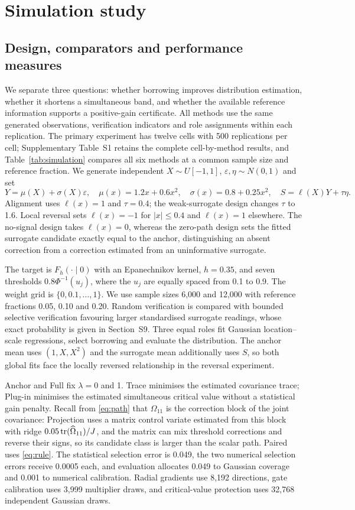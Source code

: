 \section{Simulation study}
\label{sec:simulation}
\subsection{Design, comparators and performance measures}
We separate three questions: whether borrowing improves distribution estimation, whether it shortens a simultaneous band, and whether the available reference information supports a positive-gain certificate. All methods use the same generated observations, verification indicators and role assignments within each replication. The primary experiment has twelve cells with 500 replications per cell; Supplementary Table~S1 retains the complete cell-by-method results, and Table~\ref{tab:simulation} compares all six methods at a common sample size and reference fraction. We generate independent $X\sim U[-1,1]$, $\varepsilon,\eta\sim N(0,1)$ and set
\[
 Y=\mu(X)+\sigma(X)\varepsilon,\quad
 \mu(x)=1.2x+0.6x^2,\quad \sigma(x)=0.8+0.25x^2,\quad
 S=\ell(X)Y+\tau\eta.
\]
Alignment uses $\ell(x)=1$ and $\tau=0.4$; the weak-surrogate design changes $\tau$ to 1.6. Local reversal sets $\ell(x)=-1$ for $|x|\leq0.4$ and $\ell(x)=1$ elsewhere. The no-signal design takes $\ell(x)=0$, whereas the zero-path design sets the fitted surrogate candidate exactly equal to the anchor, distinguishing an absent correction from a correction estimated from an uninformative surrogate.

The target is $F_h(\cdot\mid0)$ with an Epanechnikov kernel, $h=0.35$, and seven thresholds $0.8\Phi^{-1}(u_j)$, where the $u_j$ are equally spaced from 0.1 to 0.9. The weight grid is $\{0,0.1,\ldots,1\}$. We use sample sizes 6,000 and 12,000 with reference fractions 0.05, 0.10 and 0.20. Random verification is compared with bounded selective verification favouring larger standardised surrogate readings, whose exact probability is given in Section~S9. Three equal roles fit Gaussian location--scale regressions, select borrowing and evaluate the distribution. The anchor mean uses $(1,X,X^2)$ and the surrogate mean additionally uses $S$, so both global fits face the locally reversed relationship in the reversal experiment.

Anchor and Full fix $\lambda=0$ and 1. Trace minimises the estimated covariance trace; Plug-in minimises the estimated simultaneous critical value without a statistical gain penalty. Recall from \eqref{eq:path} that $\Omega_{11}$ is the correction block of the joint covariance: Projection uses a matrix control variate estimated from this block with ridge $0.05\operatorname{tr}(\widehat\Omega_{11})/J$, and the matrix can mix threshold corrections and reverse their signs, so its candidate class is larger than the scalar path. Paired uses \eqref{eq:rule}. The statistical selection error is 0.049, the two numerical selection errors receive 0.0005 each, and evaluation allocates 0.049 to Gaussian coverage and 0.001 to numerical calibration. Radial gradients use 8,192 directions, gate calibration uses 3,999 multiplier draws, and critical-value protection uses 32,768 independent Gaussian draws.

